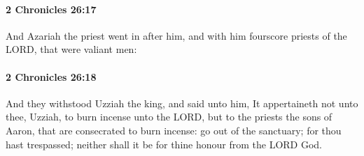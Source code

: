 		\paragraph{2 Chronicles 26:17} %
			\label{2CHRONICLES-26-17}

			And Azariah the priest went in after him, and with him fourscore priests of the LORD, that were valiant men:


		\paragraph{2 Chronicles 26:18} %
			\label{2CHRONICLES-26-18}

			And they withstood Uzziah the king, and said unto him, It appertaineth not unto thee, Uzziah, to burn incense unto the LORD, but to the priests the sons of Aaron, that are consecrated to burn incense: go out of the sanctuary; for thou hast trespassed; neither shall it be for thine honour from the LORD God.

